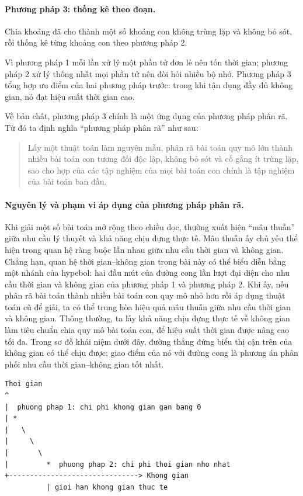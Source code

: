\documentclass[11pt]{article}
\begin{document}
\paragraph{Phương pháp 3: thống kê theo đoạn.}
Chia khoảng đã cho thành một số khoảng con không trùng lặp và không bỏ sót,
rồi thống kê từng khoảng con theo phương pháp 2.

Vì phương pháp 1 mỗi lần xử lý một phần tử đơn lẻ nên tốn thời gian; phương
pháp 2 xử lý thống nhất mọi phần tử nên đòi hỏi nhiều bộ nhớ. Phương pháp 3
tổng hợp ưu điểm của hai phương pháp trước: trong khi tận dụng đầy đủ không
gian, nó đạt hiệu suất thời gian cao.

Về bản chất, phương pháp 3 chính là một ứng dụng của phương pháp phân rã. Từ
đó ta định nghĩa ``phương pháp phân rã'' như sau:

\begin{quote}
Lấy một thuật toán làm nguyên mẫu, phân rã bài toán quy mô lớn thành nhiều
bài toán con tương đối độc lập, không bỏ sót và cố gắng ít trùng lặp, sao cho
hợp của các tập nghiệm của mọi bài toán con chính là tập nghiệm của bài toán
ban đầu.
\end{quote}

\paragraph{Nguyên lý và phạm vi áp dụng của phương pháp phân rã.}
Khi giải một số bài toán mở rộng theo chiều dọc, thường xuất hiện ``mâu
thuẫn'' giữa nhu cầu lý thuyết và khả năng chịu đựng thực tế. Mâu thuẫn ấy
chủ yếu thể hiện trong quan hệ ràng buộc lẫn nhau giữa nhu cầu thời gian và
không gian. Chẳng hạn, quan hệ thời gian--không gian trong bài này có thể
biểu diễn bằng một nhánh của hypebol: hai đầu mút của đường cong lần lượt đại
diện cho nhu cầu thời gian và không gian của phương pháp 1 và phương pháp 2.
Khi ấy, nếu phân rã bài toán thành nhiều bài toán con quy mô nhỏ hơn rồi áp
dụng thuật toán cũ để giải, ta có thể trung hòa hiệu quả mâu thuẫn giữa nhu
cầu thời gian và không gian. Thông thường, ta lấy khả năng chịu đựng thực tế
về không gian làm tiêu chuẩn chia quy mô bài toán con, để hiệu suất thời gian
được nâng cao tối đa. Trong sơ đồ khái niệm dưới đây, đường thẳng đứng biểu
thị cận trên của không gian có thể chịu được; giao điểm của nó với đường cong
là phương án phân phối nhu cầu thời gian--không gian tốt nhất.

\begin{verbatim}
Thoi gian
^
|  phuong phap 1: chi phi khong gian gan bang 0
| *
|   \
|     \
|       \
|         *  phuong phap 2: chi phi thoi gian nho nhat
+-------------------------------> Khong gian
          | gioi han khong gian thuc te
\end{verbatim}
\end{document}
